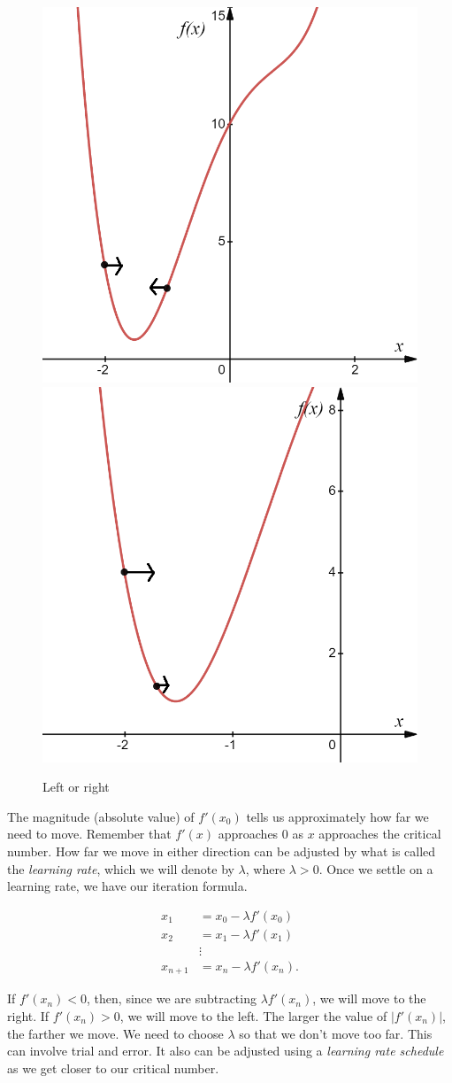 \documentclass[
]{book}
\theoremstyle{definition}
\theoremstyle{definition}
\theoremstyle{definition}
\theoremstyle{definition}
\theoremstyle{remark}
\begin{document}
\begin{figure}

{\centering \includegraphics[width=0.4\linewidth]{images/dg3} \includegraphics[width=0.4\linewidth]{images/dg4} 

}

\caption{Left or right}\label{fig:GD2}
\end{figure}

The magnitude (absolute value) of \(f'(x_0)\) tells us approximately how far we need to move. Remember that \(f'(x)\) approaches 0 as \(x\) approaches the critical number. How far we move in either direction can be adjusted by what is called the \emph{learning rate}, which we will denote by \(\lambda\), where \(\lambda>0\). Once we settle on a learning rate, we have our iteration formula.

\begin{align*}
    x_1&=x_0-\lambda f'(x_0)\\
    x_2&=x_1-\lambda f'(x_1)\\
    &\vdots \\
    x_{n+1}&=x_n-\lambda f'(x_n).
\end{align*}

If \(f'(x_n)<0\), then, since we are subtracting \(\lambda f'(x_n)\), we will move to the right. If \(f'(x_n)>0\), we will move to the left. The larger the value of \(|f'(x_n)|\), the farther we move. We need to choose \(\lambda\) so that we don't move too far. This can involve trial and error. It also can be adjusted using a \emph{learning rate schedule} as we get closer to our critical number.
\end{document}
